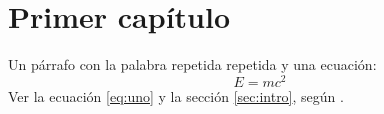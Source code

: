 \section{Primer capítulo}\label{sec:uno}
Un párrafo con la palabra repetida repetida y una ecuación:
\begin{equation}\label{eq:uno}
  E = mc^2
\end{equation}
Ver la ecuación \eqref{eq:uno} y la sección \ref{sec:intro}, según \cite{lamport94}.
